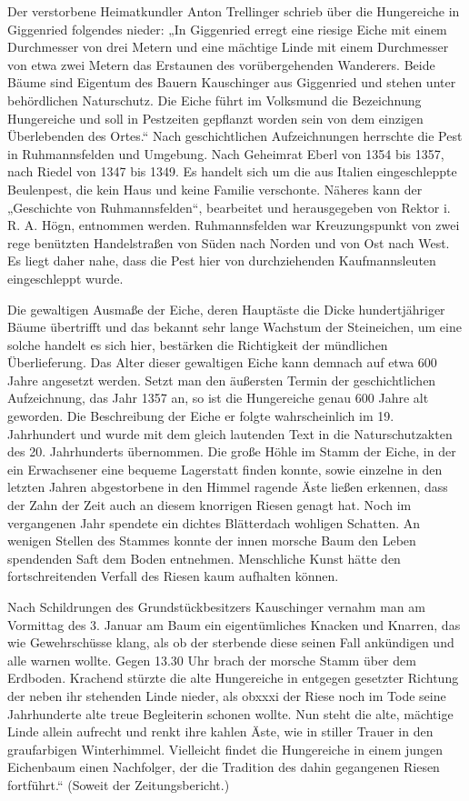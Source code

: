 \documentclass[12pt,a4pager]{book}
\begin{document}
Der verstorbene Heimatkundler Anton Trellinger schrieb über die Hungereiche in
Giggenried folgendes nieder: „In Giggenried erregt eine riesige Eiche mit einem
Durchmesser von drei Metern und eine mächtige Linde mit einem Durchmesser von
etwa zwei Metern das Erstaunen des vorübergehenden Wanderers. Beide Bäume sind
Eigentum des Bauern Kauschinger aus Giggenried und stehen unter behördlichen
Naturschutz. Die Eiche führt im Volksmund die Bezeichnung Hungereiche und soll
in Pestzeiten gepflanzt worden sein von dem einzigen Überlebenden des Ortes.“
Nach geschichtlichen Aufzeichnungen herrschte die Pest in Ruhmannsfelden und
Umgebung. Nach Geheimrat Eberl von 1354 bis 1357, nach Riedel     von 1347 bis
1349. Es handelt sich um die aus Italien eingeschleppte Beulenpest, die kein
Haus und keine Familie verschonte. Näheres kann der „Geschichte von
Ruhmannsfelden“, bearbeitet und herausgegeben von Rektor i. R. A. Högn,
entnommen werden. Ruhmannsfelden war Kreuzungspunkt von zwei rege benützten
Handelstraßen von Süden nach Norden und von Ost nach West. Es liegt daher nahe,
dass die Pest hier von durchziehenden Kaufmannsleuten eingeschleppt wurde.

Die gewaltigen Ausmaße der Eiche, deren Hauptäste die Dicke hundertjähriger
Bäume übertrifft und das bekannt sehr lange Wachstum der Steineichen, um eine
solche handelt es sich hier, bestärken die Richtigkeit der mündlichen
Überlieferung. Das Alter dieser gewaltigen Eiche kann demnach auf etwa 600 Jahre
angesetzt werden. Setzt man den äußersten Termin der geschichtlichen
Aufzeichnung, das Jahr 1357 an, so ist die Hungereiche genau 600 Jahre alt
geworden. Die Beschreibung der Eiche er folgte wahrscheinlich im 19. Jahrhundert
und wurde mit dem gleich lautenden Text in die Naturschutzakten des 20.
Jahrhunderts übernommen. Die große Höhle im Stamm der Eiche, in der ein
Erwachsener eine bequeme Lagerstatt finden konnte, sowie einzelne in den letzten
Jahren abgestorbene in den Himmel ragende Äste ließen erkennen, dass der Zahn
der Zeit auch an diesem knorrigen Riesen genagt hat. Noch im vergangenen Jahr
spendete ein dichtes Blätterdach wohligen Schatten. An wenigen Stellen des
Stammes konnte der innen morsche Baum den Leben spendenden Saft dem Boden
entnehmen. Menschliche Kunst hätte den fortschreitenden Verfall des Riesen kaum
aufhalten können.

Nach Schildrungen des Grundstückbesitzers Kauschinger vernahm man am Vormittag
des 3. Januar am Baum ein eigentümliches Knacken und Knarren, das wie
Gewehrschüsse klang, als ob der sterbende diese seinen Fall ankündigen und alle
warnen wollte. Gegen 13.30 Uhr brach der morsche Stamm über dem Erdboden.
Krachend stürzte die alte Hungereiche in entgegen gesetzter Richtung der neben
ihr stehenden Linde nieder, als obxxxi der Riese noch im Tode seine Jahrhunderte
alte treue Begleiterin schonen wollte. Nun steht die alte, mächtige Linde allein
aufrecht und renkt ihre kahlen Äste, wie in stiller Trauer in den graufarbigen
Winterhimmel. Vielleicht findet die Hungereiche in einem jungen Eichenbaum einen
Nachfolger, der die Tradition des dahin gegangenen Riesen fortführt.“ (Soweit
der Zeitungsbericht.)
\end{document}
